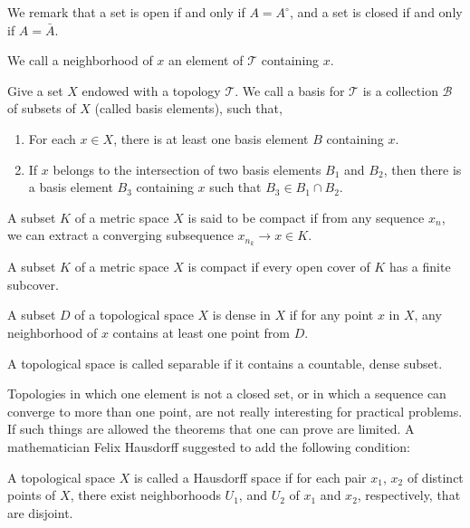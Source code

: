 We remark that a set is open if and only if $A=A^{\circ}$, and a set is closed if and only if $A=\bar{A}$.  


We call a neighborhood of $x$ an element of $\mathcal{T}$ containing $x$.
\begin{definition}
	Give a set $X$ endowed with a topology $\mathcal T$. We call a basis for $\mathcal{T}$ is a collection $\mathcal{B}$ of subsets of $X$ (called basis elements), such that,
	\begin{enumerate}
		\item  For each $x\in X$, there is at least one basis element $B$ containing $x$. 
		\item  If $x$ belongs to the intersection of two basis elements $B_1$ and $B_2$, then there is a basis element $B_3$ containing $x$ such that $B_3 \in B_1 \cap B_2$. 
	\end{enumerate}
\end{definition}

\begin{definition}
	A subset $K$ of a metric space $X$ is said to be compact if from any sequence $x_n$, we can extract a converging subsequence $x_{n_k} \rightarrow x \in K$.
\end{definition}

\begin{definition}[Compactness]
	A subset $K$ of a metric space $X$ is compact if every open cover of $K$ has a finite subcover. 
\end{definition}

\begin{definition}
	A subset $D$ of a topological space $X$ is dense in $X$ if for any point $x$ in $X$, any neighborhood of $x$ contains at least one point from $D$.
\end{definition}

\begin{definition}
	A topological space is called separable if it contains a countable, dense subset.
\end{definition}

Topologies in which one element is not a closed set, or in which a sequence can converge to more than one point, are not really interesting for practical problems. If such things are allowed the theorems that one can prove are limited. A mathematician Felix Hausdorff suggested to add the following condition:
  
\begin{definition}
A topological space $X$ is called a Hausdorff space if for each pair $x_1$, $x_2$ of distinct points of $X$, there exist neighborhoods $U_1$, and $U_2$ of $x_1$ and $x_2$, respectively, that are disjoint. 
\end{definition}


